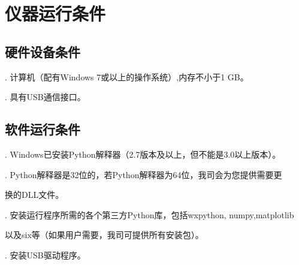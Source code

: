 \chapter{\heiti 仪器运行条件}
\section{\heiti 硬件设备条件}
. 计算机（配有Windows 7或以上的操作系统）,内存不小于1 GB。

. 具有USB通信接口。

\section{\heiti 软件运行条件}
. Windows已安装Python解释器（2.7版本及以上，但不能是3.0以上版本）。

. Python解释器是32位的，若Python解释器为64位，我司会为您提供需要更

\hspace{-1em}换的DLL文件。

. 安装运行程序所需的各个第三方Python库，包括wxpython, numpy,matplotlib

\hspace{-0.9em}以及six等（如果用户需要，我司可提供所有安装包）。

. 安装USB驱动程序。
